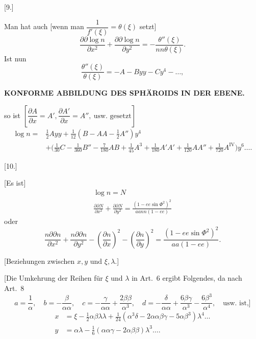 \begin{center}[9.]\end{center}
Man hat auch [wenn man \(\dfrac{1}{f'(\xi)}=\theta(\xi)\) setzt]
\[
\frac{\partial\partial\log n}{\partial x^2}+\frac{\partial\partial\log n}{\partial y^2}
=-\frac{\theta''(\xi)}{nn\theta(\xi)}.
\]
Ist nun
\[
\frac{\theta''(\xi)}{\theta(\xi)}=-A-Byy-Cy^4-\ldots,
\]

\par\clearpage
\noindent\null\hfill{\small\textbf{KONFORME ABBILDUNG DES SPHÄROIDS IN DER EBENE.}}\hfill{}\par\medskip

\noindent so ist \(\left[\dfrac{\partial A}{\partial x}=A',
\dfrac{\partial A'}{\partial x}=A'',\ \text{usw. gesetzt}\right]\)
\[
\begin{aligned}
\log n={}&\tfrac12Ayy+\tfrac1{12}(B-AA-\tfrac12 A'')y^4\\
 &+\bigl(\tfrac1{30}C-\tfrac1{360}B''-\tfrac7{180}AB+\tfrac1{45}A^3
 +\tfrac1{180}A'A'+\tfrac1{120}AA''+\tfrac1{720}A^{\mathrm{IV}}\bigr)y^6\ldots.
\end{aligned}
\]

\begin{center}[10.]\end{center}
[Es ist]
\[
\begin{gathered}
\log n=N\\
\frac{\partial\partial N}{\partial x^2}+\frac{\partial\partial N}{\partial y^2}
=\frac{(1-ee\sin\Phi^2)^2}{aann(1-ee)}
\end{gathered}
\]
\noindent oder
\[
\frac{n\partial\partial n}{\partial x^2}+\frac{n\partial\partial n}{\partial y^2}
-\left(\frac{\partial n}{\partial x}\right)^2-\left(\frac{\partial n}{\partial y}\right)^2
=\frac{(1-ee\sin\Phi^2)^2}{aa(1-ee)}.
\]

\begin{center}
[Beziehungen zwischen \(x,y\) und \(\xi,\lambda\).]\par\medskip
[11.]
\end{center}
[Die Umkehrung der Reihen für \(\xi\) und \(\lambda\) in Art.\ 6 ergibt Folgendes, da nach Art.\ 8
\[
a=\frac1\alpha,\quad b=-\frac{\beta}{\alpha\alpha},\quad
c=-\frac{\gamma}{\alpha\alpha}+\frac{2\beta\beta}{\alpha^3},\quad
d=-\frac{\delta}{\alpha\alpha}+\frac{6\beta\gamma}{\alpha^3}
-\frac{6\beta^3}{\alpha^4},\quad\text{usw. ist,]}
\]
\[
\begin{aligned}
x&=\xi-\tfrac12\alpha\beta\lambda\lambda
+\tfrac1{24}(\alpha^3\delta-2\alpha\alpha\beta\gamma-5\alpha\beta^3)\lambda^4\ldots\\
y&=\alpha\lambda-\tfrac16(\alpha\alpha\gamma-2\alpha\beta\beta)\lambda^3\ldots.
\end{aligned}
\]


